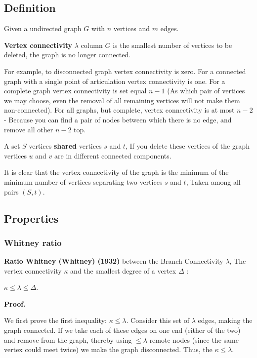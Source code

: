 \subsection{ Definition }

Given a undirected graph $G$ with $n$ vertices and $m$ edges.

\textbf{Vertex connectivity} $\lambda$ column $G$ is the smallest number of vertices to be deleted, the graph is no longer connected.

For example, to disconnected graph vertex connectivity is zero. For a connected graph with a single point of articulation vertex connectivity is one. For a complete graph vertex connectivity is set equal $n-1$ (As which pair of vertices we may choose, even the removal of all remaining vertices will not make them non-connected). For all graphs, but complete, vertex connectivity is at most $n-2$ - Because you can find a pair of nodes between which there is no edge, and remove all other $n-2$ top.

A set $S$ vertices \textbf{shared} vertices $s$ and $t$, If you delete these vertices of the graph vertices $u$ and $v$ are in different connected components.

It is clear that the vertex connectivity of the graph is the minimum of the minimum number of vertices separating two vertices $s$ and $t$, Taken among all pairs $(S, t)$.

\subsection{ Properties }

\subsubsection{ Whitney ratio }

\textbf{Ratio Whitney (Whitney) (1932)} between the Branch Connectivity $\lambda$, The vertex connectivity $\kappa$ and the smallest degree of a vertex $\Delta$ :

$\kappa \le \lambda \le \Delta.$

\textbf{Proof.}

We first prove the first inequality: $\kappa \le \lambda$. Consider this set of $\lambda$ edges, making the graph connected. If we take each of these edges on one end (either of the two) and remove from the graph, thereby using $\le \lambda$ remote nodes (since the same vertex could meet twice) we make the graph disconnected. Thus, the $\kappa \le \lambda$.

